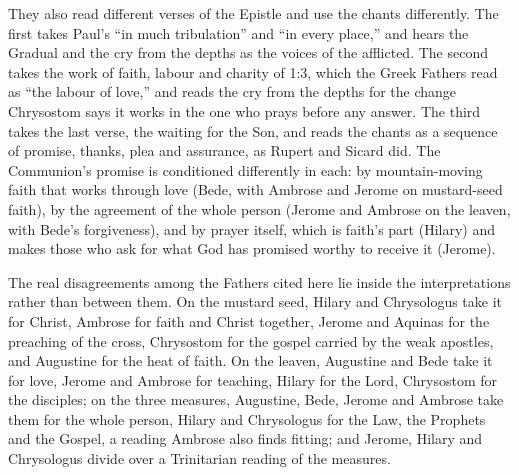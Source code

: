 They also read different verses of the Epistle and use the chants
differently. The first takes Paul's ``in much tribulation'' and ``in every
place,'' and hears the Gradual and the cry from the depths as the voices of the
afflicted. The second takes the work of faith, labour and charity of 1:3,
which the Greek Fathers read as ``the labour of love,'' and reads the cry
from the depths for the change Chrysostom says it works in the one who prays
before any answer. The third takes the last verse, the waiting
for the Son, and reads the chants as a sequence of promise, thanks, plea and
assurance, as Rupert and Sicard did. The Communion's promise is conditioned
differently in each: by mountain-moving faith that works through love
(Bede, with Ambrose and Jerome on mustard-seed faith), by the agreement of
the whole person (Jerome and Ambrose on the leaven, with Bede's forgiveness),
and by prayer itself, which is faith's part (Hilary) and makes those who ask
for what God has promised worthy to receive it (Jerome).

The real disagreements among the Fathers cited here lie inside the
interpretations rather than between them. On the mustard seed, Hilary and
Chrysologus take it for Christ, Ambrose for faith and Christ together, Jerome
and Aquinas for the preaching of the cross, Chrysostom for the gospel carried
by the weak apostles, and Augustine for the heat of faith. On the leaven,
Augustine and Bede take it for love, Jerome and Ambrose for teaching, Hilary
for the Lord, Chrysostom for the disciples; on the three measures, Augustine,
Bede, Jerome and Ambrose take them for the whole person, Hilary and
Chrysologus for the Law, the Prophets and the Gospel, a reading Ambrose also
finds fitting; and Jerome, Hilary and Chrysologus divide over a Trinitarian
reading of the measures.
